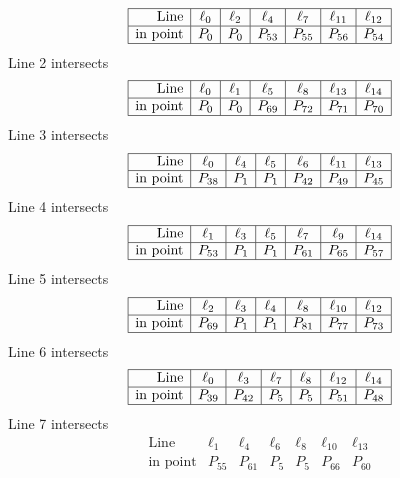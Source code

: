 \documentclass{article}
\begin{document}
{$$\begin{array}{|r*{6}{|c}|}
\hline
\mbox{Line}  & \ell_{0} & \ell_{2} & \ell_{4} & \ell_{7} & \ell_{11} & \ell_{12}\\
\hline
\mbox{in point}  & P_{0} & P_{0} & P_{53} & P_{55} & P_{56} & P_{54}\\
\hline
\end{array}
$$
Line 2 intersects 
$$
\begin{array}{|r*{6}{|c}|}
\hline
\mbox{Line}  & \ell_{0} & \ell_{1} & \ell_{5} & \ell_{8} & \ell_{13} & \ell_{14}\\
\hline
\mbox{in point}  & P_{0} & P_{0} & P_{69} & P_{72} & P_{71} & P_{70}\\
\hline
\end{array}
$$
Line 3 intersects 
$$
\begin{array}{|r*{6}{|c}|}
\hline
\mbox{Line}  & \ell_{0} & \ell_{4} & \ell_{5} & \ell_{6} & \ell_{11} & \ell_{13}\\
\hline
\mbox{in point}  & P_{38} & P_{1} & P_{1} & P_{42} & P_{49} & P_{45}\\
\hline
\end{array}
$$
Line 4 intersects 
$$
\begin{array}{|r*{6}{|c}|}
\hline
\mbox{Line}  & \ell_{1} & \ell_{3} & \ell_{5} & \ell_{7} & \ell_{9} & \ell_{14}\\
\hline
\mbox{in point}  & P_{53} & P_{1} & P_{1} & P_{61} & P_{65} & P_{57}\\
\hline
\end{array}
$$
Line 5 intersects 
$$
\begin{array}{|r*{6}{|c}|}
\hline
\mbox{Line}  & \ell_{2} & \ell_{3} & \ell_{4} & \ell_{8} & \ell_{10} & \ell_{12}\\
\hline
\mbox{in point}  & P_{69} & P_{1} & P_{1} & P_{81} & P_{77} & P_{73}\\
\hline
\end{array}
$$
Line 6 intersects 
$$
\begin{array}{|r*{6}{|c}|}
\hline
\mbox{Line}  & \ell_{0} & \ell_{3} & \ell_{7} & \ell_{8} & \ell_{12} & \ell_{14}\\
\hline
\mbox{in point}  & P_{39} & P_{42} & P_{5} & P_{5} & P_{51} & P_{48}\\
\hline
\end{array}
$$
Line 7 intersects 
$$
\begin{array}{|r*{6}{|c}|}
\hline
\mbox{Line}  & \ell_{1} & \ell_{4} & \ell_{6} & \ell_{8} & \ell_{10} & \ell_{13}\\
\hline
\mbox{in point}  & P_{55} & P_{61} & P_{5} & P_{5} & P_{66} & P_{60}\\

\end{array}$$}
\end{document}
